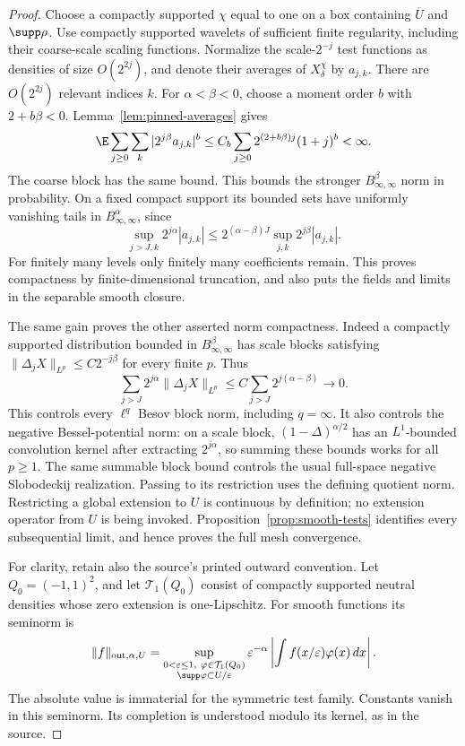 \begin{proof}
Choose a compactly supported \(\chi\) equal to one on a box containing
\(\overline U\) and \(\supp\rho\). Use compactly supported wavelets of
sufficient finite regularity, including their coarse-scale scaling
functions. Normalize the scale-\(2^{-j}\) test functions as densities
of size \(O(2^{2j})\), and denote their averages of \(X_\delta^\chi\)
by \(a_{j,k}\). There are \(O(2^{2j})\) relevant indices \(k\).
For \(\alpha<\beta<0\), choose a moment order \(b\) with
\(2+b\beta<0\). Lemma~\ref{lem:pinned-averages} gives
\begin{equation}\label{eq:prob-wavelet-sum}
 \E\sum_{j\ge0}\sum_k|2^{j\beta}a_{j,k}|^b
 \le C_b\sum_{j\ge0}2^{(2+b\beta)j}(1+j)^b<\infty.
\end{equation}
The coarse block has the same bound. This bounds the stronger
\(B^\beta_{\infty,\infty}\) norm in probability. On a fixed compact
support its bounded sets have uniformly vanishing tails in
\(B^\alpha_{\infty,\infty}\), since
\[
 \sup_{j>J,k}2^{j\alpha}|a_{j,k}|
 \le 2^{(\alpha-\beta)J}
          \sup_{j,k}2^{j\beta}|a_{j,k}|.
\]
For finitely many levels only finitely many coefficients remain.
This proves compactness by finite-dimensional truncation, and also puts
the fields and limits in the separable smooth closure.

The same gain proves the other asserted norm compactness. Indeed a
compactly supported distribution bounded in \(B^\beta_{\infty,\infty}\)
has scale blocks satisfying
\(\|\Delta_j X\|_{L^p}\le C2^{-j\beta}\) for every finite \(p\).
Thus
\[
 \sum_{j>J}2^{j\alpha}\|\Delta_jX\|_{L^p}
 \le C\sum_{j>J}2^{j(\alpha-\beta)}\longrightarrow0.
\]
This controls every \(\ell^q\) Besov block norm, including \(q=\infty\).
It also controls the negative Bessel-potential norm: on a scale block,
\((1-\Delta)^{\alpha/2}\) has an \(L^1\)-bounded convolution kernel
after extracting \(2^{j\alpha}\), so summing these bounds works for
all \(p\ge1\). The same summable block bound controls the usual
full-space negative Slobodeckij realization. Passing to its restriction
uses the defining quotient norm. Restricting a global extension to
\(U\) is continuous by definition; no extension operator from \(U\) is
being invoked. Proposition~\ref{prop:smooth-tests} identifies every
subsequential limit, and hence proves the full mesh convergence.

For clarity, retain also the source's printed outward convention.
Let \(Q_0=(-1,1)^2\), and let \(\mathcal T_1(Q_0)\) consist of
compactly supported neutral densities whose zero extension is
one-Lipschitz. For smooth functions its seminorm is
\begin{equation}\label{eq:prob-outward-norm}
 \|f\|_{\mathrm{out},\alpha,U}
 =\sup_{\substack{0<\varepsilon\le1,\ \varphi\in\mathcal T_1(Q_0)\\
                    \supp\varphi\subset U/\varepsilon}}
  \varepsilon^{-\alpha}
     \left|\int f(x/\varepsilon)\varphi(x)\,dx\right|.
\end{equation}
The absolute value is immaterial for the symmetric test family.
Constants vanish in this seminorm. Its completion is understood modulo
its kernel, as in the source.


\end{proof}

